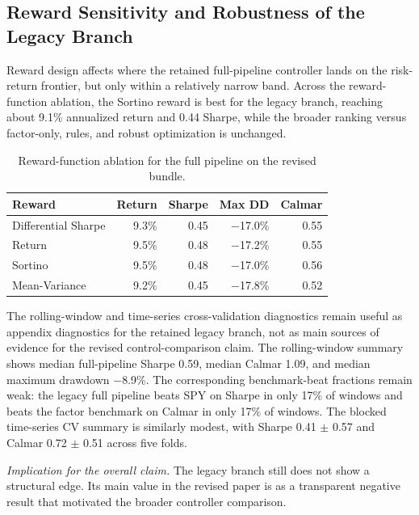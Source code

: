 \documentclass[11pt]{article}
\begin{document}
\subsection{Reward Sensitivity and Robustness of the Legacy Branch}

Reward design affects where the retained full-pipeline controller lands on the
risk-return frontier, but only within a relatively narrow band. Across the
reward-function ablation, the Sortino reward is best for the legacy branch,
reaching about 9.1\% annualized return and 0.44 Sharpe, while the broader
ranking versus factor-only, rules, and robust optimization is unchanged.

\begin{table}[t]
\centering
\small
\caption{Reward-function ablation for the full pipeline on the revised bundle.}
\label{tab:reward_ablation}
\begin{tabular}{@{} l r r r r @{}}
\toprule
\textbf{Reward} & \textbf{Return} & \textbf{Sharpe} & \textbf{Max DD} & \textbf{Calmar} \\
\midrule
Differential Sharpe & 9.3\% & 0.45 & $-$17.0\% & 0.55 \\
Return              & 9.5\% & 0.48 & $-$17.2\% & 0.55 \\
Sortino             & 9.5\% & 0.48 & $-$17.0\% & 0.56 \\
Mean-Variance       & 9.2\% & 0.45 & $-$17.8\% & 0.52 \\
\bottomrule
\end{tabular}
\end{table}

The rolling-window and time-series cross-validation diagnostics remain useful as appendix diagnostics for the retained legacy branch, not as main sources of evidence for the revised control-comparison claim. The rolling-window summary
shows median full-pipeline Sharpe 0.59, median Calmar 1.09, and median maximum
drawdown $-$8.9\%. The corresponding benchmark-beat fractions remain weak:
the legacy full pipeline beats SPY on Sharpe in only 17\% of windows and beats
the factor benchmark on Calmar in only 17\% of windows. The blocked time-series
CV summary is similarly modest, with Sharpe 0.41 $\pm$ 0.57 and Calmar
0.72 $\pm$ 0.51 across five folds.

\noindent\textit{Implication for the overall claim.} The legacy branch still
does not show a structural edge. Its main value in the revised paper is as a
transparent negative result that motivated the broader controller comparison.
\end{document}
